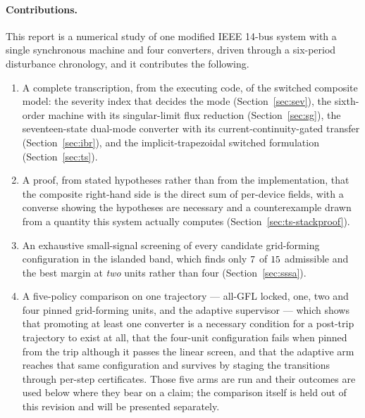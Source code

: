 \documentclass[12pt,a4paper]{article}
\theoremstyle{remark}
\begin{document}
\paragraph{Contributions.}
This report is a numerical study of one modified IEEE 14-bus system with a single
synchronous machine and four converters, driven through a six-period disturbance
chronology, and it contributes the following.
\begin{enumerate}\itemsep2pt
  \item A complete transcription, from the executing code, of the switched
        composite model: the severity index that decides the mode
        (Section~\ref{sec:sev}), the sixth-order machine with its singular-limit
        flux reduction (Section~\ref{sec:sg}), the seventeen-state dual-mode
        converter with its current-continuity-gated transfer
        (Section~\ref{sec:ibr}), and the implicit-trapezoidal switched
        formulation (Section~\ref{sec:ts}).
  \item A proof, from stated hypotheses rather than from the implementation, that
        the composite right-hand side is the direct sum of per-device fields, with
        a converse showing the hypotheses are necessary and a counterexample
        drawn from a quantity this system actually computes
        (Section~\ref{sec:ts-stackproof}).
  \item An exhaustive small-signal screening of every candidate grid-forming
        configuration in the islanded band, which finds only
        $7$ of $15$ admissible and the best margin at
        \emph{two} units rather than four (Section~\ref{sec:sssa}).
  \item A five-policy comparison on one trajectory --- all-GFL locked, one, two
        and four pinned grid-forming units, and the adaptive supervisor --- which
        shows that promoting at least one converter is a necessary condition for a
        post-trip trajectory to exist at all, that the four-unit configuration
        fails when pinned from the trip although it passes the linear screen, and
        that the adaptive arm reaches that same configuration and survives by
        staging the transitions through per-step certificates. Those five arms are
        run and their outcomes are used below where they bear on a claim; the
        comparison itself is held out of this revision and will be presented
        separately.
\end{enumerate}
\end{document}
